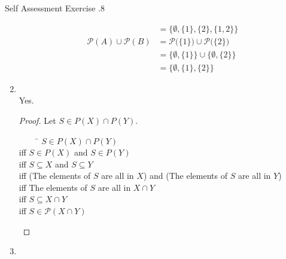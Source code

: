 \documentclass[\main/notes.tex]{subfiles}
\begin{document}
\begin{exercise}{Self Assessment Exercise \thechapter.8}
\begin{enumerate}
\begin{align*}
						&= \bigl\{\emptyset, \{1\}, \{2\}, \{1, 2\}\bigr\}\\
						\mathcal{P}(A) \cup \mathcal{P}(B) &= \mathcal{P}\bigl(\{1\}\bigr) \cup \mathcal{P}\bigl(\{2\}\bigr)\\
						&= \bigl\{\emptyset, \{1\}\bigr\} \cup \bigl\{\emptyset, \{2\}\bigr\}\\
						&= \bigl\{\emptyset, \{1\}, \{2\}\bigr\}
					\end{align*}
				\pagebreak
				\item {}\\
					Yes.
					\begin{proof}
						Let $S \in P(X) \cap P(Y)$.
						\begin{tabbing}
							$\qquad$ \= $S \in P(X) \cap P(Y)$\\
							iff \> $S \in P(X)$ and $S \in P(Y)$\\
							iff \> $S \subseteq X$ and $S \subseteq Y$\\
							iff \> (The elements of $S$ are all in $X$) and (The elements of $S$ are all in $Y$)\\
							iff \> The elements of $S$ are all in $X \cap Y$\\
							iff \> $S \subseteq X \cap Y$\\
							iff \> $S \in \mathcal{P}(X \cap Y)$
						\end{tabbing}
					\end{proof}
				\item {}
					\begin{center}
						\begin{vennthree}[labelA=$X$, labelB=$Y$, labelC=$Z$, tikzoptions={scale=0.8}][$X$]
							\fillA
						\end{vennthree}
						\begin{vennthree}[labelA=$X$, labelB=$Y$, labelC=$Z$, tikzoptions={scale=0.8}][$Y - Z$]
							\fillBNotC
						\end{vennthree}
						\begin{vennthree}[labelA=$X$, labelB=$Y$, labelC=$Z$, tikzoptions={scale=0.8}][$X - (Y - Z)$]
							\fillOnlyA
							\fillACapC
						\end{vennthree}
						\begin{vennthree}[labelA=$X$, labelB=$Y$, labelC=$Z$, tikzoptions={scale=0.8}][$X - Y$]

\end{vennthree}
\end{center}
\end{enumerate}
\end{exercise}
\end{document}
